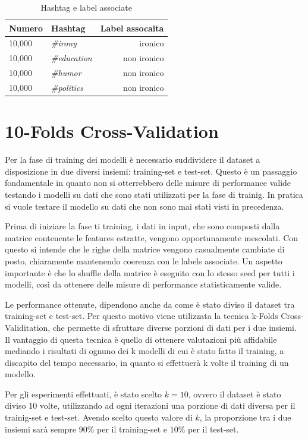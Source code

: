 \documentclass[oneside]{book}
\begin{document}
\begin{table}[ht]
	\centering
	\begin{tabular}[t]{llr}
		\hline
		\textbf{Numero} & \textbf{Hashtag}  & \textbf{Label assocaita}\\
		\hline
		10,000 & \emph{\#irony}     & ironico     \\
		10,000 & \emph{\#education} & non ironico \\
		10,000 & \emph{\#humor}     & non ironico \\
		10,000 & \emph{\#politics}  & non ironico \\
		\hline
	\end{tabular}
	\caption{Hashtag e label associate}
\end{table}%

\section{10-Folds Cross-Validation}
Per la fase di training dei modelli è necessario suddividere il dataset a disposizione in due diversi insiemi: training-set e test-set. Questo è un passaggio fondamentale in quanto non si otterrebbero delle misure di performance valide testando i modelli su dati che sono stati utilizzati per la fase di trainig. In pratica si vuole testare il modello su dati che non sono mai stati visti in precedenza.

Prima di iniziare la fase ti training, i dati in input, che sono composti dalla matrice contenente le features estratte, vengono opportunamente mescolati. Con questo si intende che le righe della matrice vengono casualmente cambiate di posto, chiaramente mantenendo coerenza con le labels associate. Un aspetto importante è che lo shuffle della matrice è eseguito con lo stesso seed per tutti i modelli, così da ottenere delle misure di performance statisticamente valide.

Le performance ottenute, dipendono anche da come è stato diviso il dataset tra training-set e test-set. Per questo motivo viene utilizzata la tecnica k-Folds Cross-Validitation, che permette di sfruttare diverse porzioni di dati per i due insiemi. Il vantaggio di questa tecnica è quello di ottenere valutazioni più affidabile mediando i risultati di ognuno dei k modelli di cui è stato fatto il training, a discapito del tempo necessario, in quanto si effettuerà k volte il training di un modello.

Per gli esperimenti effettuati, è stato scelto $k=10$, ovvero il dataset è stato diviso 10 volte, utilizzando ad ogni iterazioni una porzione di dati diversa per il trainig-set e test-set. Avendo scelto questo valore di $k$, la proporzione tra i due insiemi sarà sempre $90\%$ per il training-set e $10\%$ per il test-set.
\end{document}
